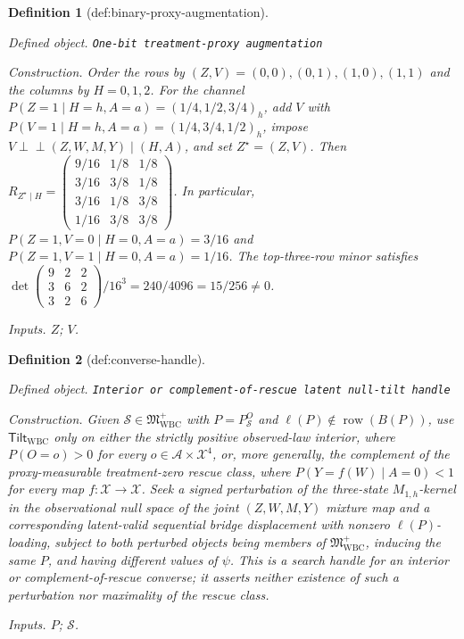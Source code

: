 \documentclass{article}
\newtheorem{definition}{Definition}
\begin{document}
\begin{definition}[def:binary-proxy-augmentation]\label{def:binary-proxy-augmentation}
\par\smallskip\noindent\emph{Defined object.} \texttt{One-\allowbreak{}bit treatment-\allowbreak{}proxy augmentation}
\par\smallskip\noindent\emph{Construction.} Order the rows by \((Z,V)=(0,0),(0,1),(1,0),(1,1)\) and the columns by \(H=0,1,2\). For the channel \(P(Z=1\mid H=h,A=a)=(1/4,1/2,3/4)_h\), add \(V\) with \(P(V=1\mid H=h,A=a)=(1/4,3/4,1/2)_h\), impose \(V\mathbin{\perp\!\!\!\perp}(Z,W,M,Y)\mid(H,A)\), and set \(Z^{\star}=(Z,V)\). Then \(R_{Z^{\star}\mid H}=\begin{pmatrix}9/16&1/8&1/8\\3/16&3/8&1/8\\3/16&1/8&3/8\\1/16&3/8&3/8\end{pmatrix}\). In particular, \(P(Z=1,V=0\mid H=0,A=a)=3/16\) and \(P(Z=1,V=1\mid H=0,A=a)=1/16\). The top-three-row minor satisfies \(\det\!\begin{pmatrix}9&2&2\\3&6&2\\3&2&6\end{pmatrix}/16^3=240/4096=15/256\neq0\).
\par\smallskip\noindent\emph{Inputs.} \(Z\); \(V\).
\end{definition}

\begin{definition}[def:converse-handle]\label{def:converse-handle}
\par\smallskip\noindent\emph{Defined object.} \texttt{Interior or complement-\allowbreak{}of-\allowbreak{}rescue latent null-\allowbreak{}tilt handle}
\par\smallskip\noindent\emph{Construction.} Given \(\mathcal S\in\mathfrak M_{\mathrm{WBC}}^{+}\) with \(P=P_{\mathcal S}^O\) and \(\ell(P)\notin\operatorname{row}(B(P))\), use \(\mathsf{Tilt}_{\mathrm{WBC}}\) only on either the strictly positive observed-law interior, where \(P(O=o)>0\) for every \(o\in\mathcal A\times\mathcal X^4\), or, more generally, the complement of the proxy-measurable treatment-zero rescue class, where \(P(Y=f(W)\mid A=0)<1\) for every map \(f:\mathcal X\to\mathcal X\). Seek a signed perturbation of the three-state \(M_{1,h}\)-kernel in the observational null space of the joint \((Z,W,M,Y)\) mixture map and a corresponding latent-valid sequential bridge displacement with nonzero \(\ell(P)\)-loading, subject to both perturbed objects being members of \(\mathfrak M_{\mathrm{WBC}}^{+}\), inducing the same \(P\), and having different values of \(\psi\). This is a search handle for an interior or complement-of-rescue converse; it asserts neither existence of such a perturbation nor maximality of the rescue class.
\par\smallskip\noindent\emph{Inputs.} \(P\); \(\mathcal S\).
\end{definition}
\end{document}
